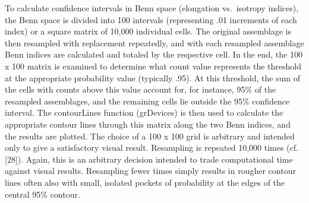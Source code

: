 \documentclass[]{article}
\begin{document}
To calculate confidence intervals in Benn space (elongation vs.~isotropy
indices), the Benn space is divided into 100 intervals (representing .01
increments of each index) or a square matrix of 10,000 individual cells.
The original assemblage is then resampled with replacement repeatedly,
and with each resampled assemblage Benn indices are calculated and
totaled by the respective cell. In the end, the 100 x 100 matrix is
examined to determine what count value represents the threshold at the
appropriate probability value (typically .95). At this threshold, the
sum of the cells with counts above this value account for, for instance,
95\% of the resampled assemblages, and the remaining cells lie outside
the 95\% confidence interval. The contourLines function (grDevices) is
then used to calculate the appropriate contour lines through this matrix
along the two Benn indices, and the results are plotted. The choice of a
100 x 100 grid is arbitrary and intended only to give a satisfactory
visual result. Resampling is repeated 10,000 times (cf. {[}28{]}).
Again, this is an arbitrary decision intended to trade computational
time against visual results. Resampling fewer times simply results in
rougher contour lines often also with small, isolated pockets of
probability at the edges of the central 95\% contour.
\end{document}
